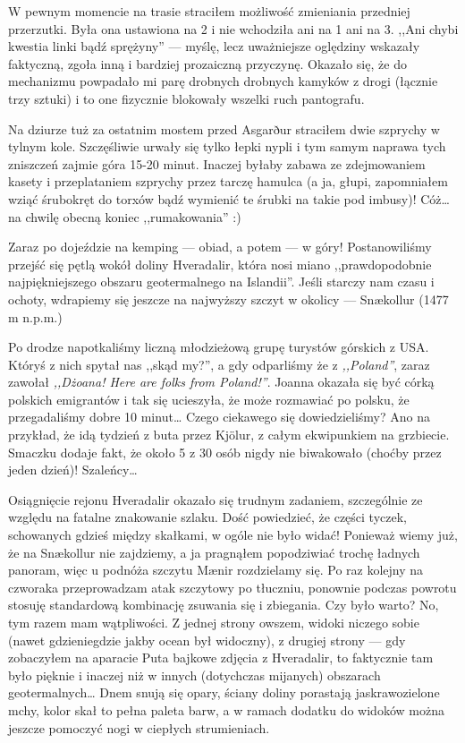 W pewnym momencie na trasie straciłem możliwość zmieniania przedniej przerzutki. Była ona ustawiona na 2 i nie wchodziła ani na 1 ani na 3. ,,Ani chybi kwestia linki bądź sprężyny'' --- myślę, lecz uważniejsze oględziny wskazały faktyczną, zgoła inną i bardziej prozaiczną przyczynę. Okazało się, że do mechanizmu powpadało mi parę drobnych drobnych kamyków z drogi (łącznie trzy sztuki) i to one fizycznie blokowały wszelki ruch pantografu.

Na dziurze tuż za ostatnim mostem przed Asgarður straciłem dwie szprychy w tylnym kole. Szczęśliwie urwały się tylko łepki nypli i tym samym naprawa tych zniszczeń zajmie góra 15-20 minut. Inaczej byłaby zabawa ze zdejmowaniem kasety i przeplataniem szprychy przez tarczę hamulca (a ja, głupi, zapomniałem wziąć śrubokręt do torxów bądź wymienić te śrubki na takie pod imbusy)! Cóż… na chwilę obecną koniec ,,rumakowania'' :)


Zaraz po dojeździe na kemping --- obiad, a potem --- w góry! Postanowiliśmy przejść się pętlą wokół doliny Hveradalir, która nosi miano ,,prawdopodobnie najpiękniejszego obszaru geotermalnego na Islandii''. Jeśli starczy nam czasu i ochoty, wdrapiemy się jeszcze na najwyższy szczyt w okolicy --- Snækollur (1477 m n.p.m.)

Po drodze napotkaliśmy liczną młodzieżową grupę turystów górskich z USA. Któryś z nich spytał nas ,,skąd my?'', a gdy odparliśmy że z \emph{,,Poland''}, zaraz zawołał \emph{,,Dżoana! Here are folks from Poland!''}. Joanna okazała się być córką polskich emigrantów i tak się ucieszyła, że może rozmawiać po polsku, że przegadaliśmy dobre 10 minut… Czego ciekawego się dowiedzieliśmy? Ano na przykład, że idą tydzień z buta przez Kjölur, z całym ekwipunkiem na grzbiecie. Smaczku dodaje fakt, że około 5 z 30 osób nigdy nie biwakowało (choćby przez jeden dzień)! Szaleńcy…


Osiągnięcie rejonu Hveradalir okazało się trudnym zadaniem, szczególnie ze względu na fatalne znakowanie szlaku. Dość powiedzieć, że części tyczek, schowanych gdzieś między skałkami, w ogóle nie było widać! Ponieważ wiemy już, że na Snækollur nie zajdziemy, a ja pragnąłem popodziwiać trochę ładnych panoram, więc u podnóża szczytu Mænir rozdzielamy się. Po raz kolejny na czworaka przeprowadzam atak szczytowy po tłuczniu, ponownie podczas powrotu stosuję standardową kombinację zsuwania się i zbiegania. Czy było warto? No, tym razem mam wątpliwości. Z jednej strony owszem, widoki niczego sobie (nawet gdzieniegdzie jakby ocean był widoczny), z drugiej strony --- gdy zobaczyłem na aparacie Puta bajkowe zdjęcia z Hveradalir, to faktycznie tam było pięknie i inaczej niż w innych (dotychczas mijanych) obszarach geotermalnych… Dnem snują się opary, ściany doliny porastają jaskrawozielone mchy, kolor skał to pełna paleta barw, a w ramach dodatku do widoków można jeszcze pomoczyć nogi w ciepłych strumieniach.

